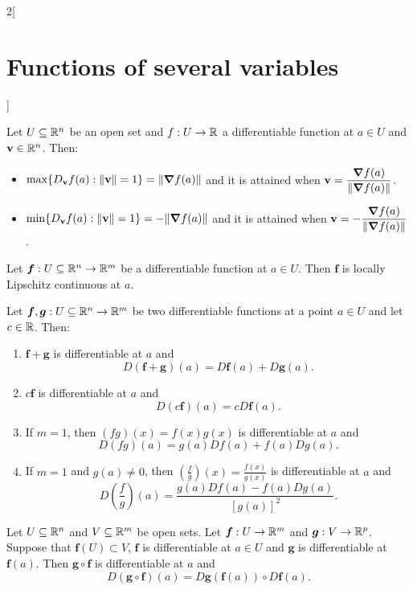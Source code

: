 \documentclass[../../../main.tex]{subfiles}
\begin{document}
\begin{multicols}{2}[\section{Functions of several variables}]
\begin{prop}
    \end{prop}
    \begin{prop}
        Let $U\subseteq\mathbb{R}^n$ be an open set and $f:U\rightarrow\mathbb{R} $ a differentiable function at $a\in U$ and $\textbf{v}\in\mathbb{R}^n$. Then:
        \begin{itemize}
            \item $\displaystyle\max\{D_\textbf{v}f(a):\|\textbf{v}\|=1\}=\|\grad f(a)\|$ and it is attained when $\displaystyle \textbf{v}=\frac{\grad f(a)}{\|\grad f(a)\|}$.
            \item $\displaystyle\min\{D_\textbf{v}f(a):\|\textbf{v}\|=1\}=-\|\grad f(a)\|$ and it is attained when $\displaystyle \textbf{v}=-\frac{\grad f(a)}{\|\grad f(a)\|}$.
        \end{itemize}
    \end{prop}
    \begin{theorem}
        Let $\boldsymbol{f}:U\subseteq\mathbb{R}^n\rightarrow\mathbb{R}^m$ be a differentiable function at $a\in U$. Then $\boldsymbol{f}$ is locally Lipschitz continuous at $a$.
    \end{theorem}
    \begin{theorem}
        Let $\boldsymbol{f},\boldsymbol{g}:U\subseteq\mathbb{R}^n\to\mathbb{R}^m$ be two differentiable functions at a point $a\in U$ and let $c\in\mathbb{R} $. Then:
        \begin{enumerate}
            \item $\boldsymbol{f}+\boldsymbol{g}$ is differentiable at $a$ and $$D(\boldsymbol{f}+\boldsymbol{g})(a)=D\boldsymbol{f}(a)+D\boldsymbol{g}(a).$$
            \item $c\boldsymbol{f}$ is differentiable at $a$ and
                  $$D(c\boldsymbol{f})(a)=cD\boldsymbol{f}(a).$$
            \item If $m=1$, then $(fg)(x)=f(x)g(x)$ is differentiable at $a$ and $$D(fg)(a)=g(a)Df(a)+f(a)Dg(a).$$
            \item If $m=1$ and $g(a)\ne0$, then $\displaystyle\left(\frac{f}{g}\right)(x)=\frac{f(x)}{g(x)}$ is differentiable at $a$ and $$D\left(\frac{f}{g}\right)(a)=\frac{g(a)Df(a)-f(a)Dg(a)}{[g(a)]^2}.$$
        \end{enumerate}
    \end{theorem}
    \begin{theorem}
        Let $U\subseteq\mathbb{R}^n$ and $V\subseteq\mathbb{R}^m$ be open sets. Let $\boldsymbol{f}:U\rightarrow\mathbb{R}^m$ and $\boldsymbol{g}:V\rightarrow\mathbb{R}^p$. Suppose that $\boldsymbol{f}(U)\subset V$, $\boldsymbol{f}$ is differentiable at $a\in U$ and $\boldsymbol{g}$ is differentiable at $\boldsymbol{f}(a)$. Then $\boldsymbol{g}\circ \boldsymbol{f}$ is differentiable at $a$ and $$D(\boldsymbol{g}\circ \boldsymbol{f})(a)=D\boldsymbol{g}(\boldsymbol{f}(a))\circ D\boldsymbol{f}(a).$$

\end{theorem}
\end{multicols}
\end{document}
